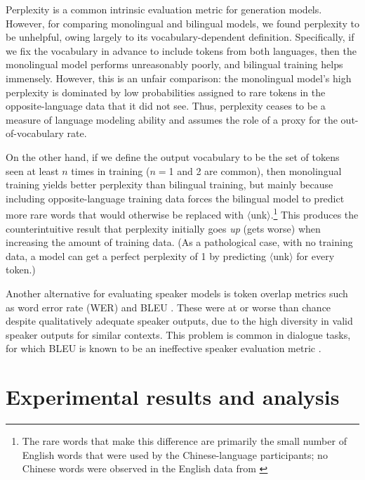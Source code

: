 \documentclass[11pt,a4paper]{article}
\renewcommand{\|}{\mid}
\begin{document}
Perplexity is a common intrinsic evaluation metric for generation models. However, for comparing monolingual and bilingual models,
we found perplexity to be
unhelpful, owing largely to its vocabulary-dependent definition. Specifically, if we fix the vocabulary in advance to include tokens
from both languages, then the monolingual model performs
unreasonably poorly, and bilingual training helps immensely. However, this is an unfair comparison: the monolingual model's high perplexity
is dominated by low probabilities assigned to rare tokens in the opposite-language data that it did not see. Thus, perplexity ceases to
be a measure of language modeling ability and assumes the role of a proxy for the out-of-vocabulary rate.

On the other hand, if we define the output vocabulary
to be the set of tokens seen at least $n$ times in training ($n={}$1 and 2 are common), then monolingual training yields
better perplexity than bilingual training, but mainly because including opposite-language training data forces the
bilingual model to predict more rare words that would otherwise be replaced with $\langle$unk$\rangle$.\footnote{The rare
words that make this difference are primarily the small number of English words that were used by the Chinese-language participants;
no Chinese words were observed in the English data from \citet{Monroe2017}} %
This produces the counterintuitive result that perplexity initially goes \emph{up} (gets worse) when increasing the amount of
training data. (As a pathological case, with no training data, a model can get a perfect perplexity
of 1 by predicting $\langle$unk$\rangle$ for every token.)

Another alternative for evaluating speaker models is token overlap metrics such as word error
rate (WER) and BLEU \cite{Papineni2002}. These were at or worse than
chance despite qualitatively adequate speaker outputs, due to the high diversity in valid speaker outputs
for similar contexts. This problem is common in dialogue tasks,
for which BLEU is known to be an ineffective speaker evaluation metric \cite{Liu2016}.

\section{Experimental results and analysis}
\end{document}
